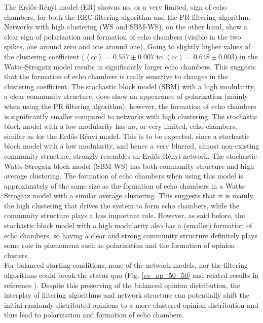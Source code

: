 \documentclass[11 pt , letterpaper , twoside , openright]{book}
\begin{document}
The Erd\H{o}s-R\'{e}nyi model (ER) showns no, or a very limited, sign of echo chambers, for both the REC filtering algorithm and the PR filtering algorithm. Networks with high clustering (WS and SBM-WS), on the other hand, show a clear sign of polarization and formation of echo chambers (visible in the two spikes, one around zero and one around one). Going to slightly higher values of the clustering coefficient ($\left<cc\right> = 0.557 \pm 0.007$ to $\left<cc\right> = 0.648 \pm 0.003$) in the Watts-Strogatz model results in significantly larger echo chambers. This suggests that the formation of echo chambers is really sensitive to changes in the clustering coefficient. The stochastic block model (SBM) with a high modularity, a clear community structure, does show an appearance of polarization (mainly when using the PR filtering algorithm), however, the formation of echo chambers is significantly smaller compared to networks with high clustering. The stochastic block model with a low modularity has no, or very limited, echo chambers, similar as for the Erd\H{o}s-R\'{e}nyi   
model. This is to be expected, since a stochastic block model with a low modularity, and hence a very blurred, almost non-existing community structure, strongly resembles an Erd\H{o}s-R\'{e}nyi network. The stochastic Watts-Strogatz block model (SBM-WS) has both community structure and high average clustering. The formation of echo chambers when using this model is approximately of the same size as the formation of echo chambers in a Watts-Strogatz model with a similar average clustering. This suggests that it is mainly the high clustering that drives the system to form echo chambers, while the community structure plays a less important role. However, as said before, the stochastic block model with a high modularity also has a (smaller) formation of echo chambers, so having a clear and strong community structure definitely plays some role in phenomena such as polarization and the formation of opinion clusters. \\
\newline
For balanced starting conditions, none of the network models, nor the filtering algorithms could break the status quo (Fig. \ref{ev_op_50_50} and related results in reference \cite{Perra2019}). Despite this preserving of the balanced opinion distribution, the interplay of filtering algorithms and network structure can potentially shift the initial randomly distributed opinions to a more clustered opinion distribution and thus lead to polarization and formation of echo chambers.
\end{document}
